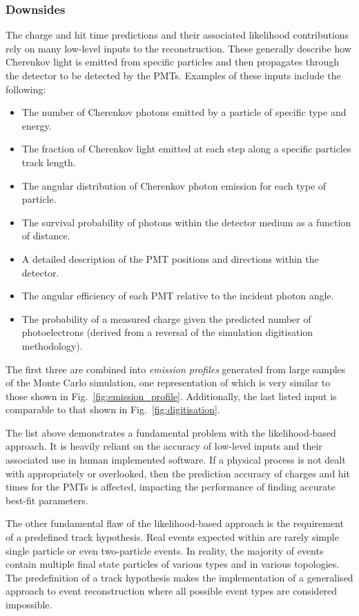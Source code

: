 \subsubsection*{Downsides} %

The charge and hit time predictions and their associated likelihood contributions rely on many
low-level inputs to the reconstruction. These generally describe how Cherenkov light is emitted
from specific particles and then propagates through the detector to be detected by the PMTs.
Examples of these inputs include the following:
\begin{itemize}
    \item The number of Cherenkov photons emitted by a particle of specific type and energy.
    \item The fraction of Cherenkov light emitted at each step along a specific particles track
          length.
    \item The angular distribution of Cherenkov photon emission for each type of particle.
    \item The survival probability of photons within the detector medium as a function of
          distance.
    \item A detailed description of the PMT positions and directions within the detector.
    \item The angular efficiency of each PMT relative to the incident photon angle.
    \item The probability of a measured charge given the predicted number of photoelectrons
          (derived from a reversal of the simulation digitisation methodology).
\end{itemize}
The first three are combined into \emph{emission profiles} generated from large samples of the
Monte Carlo simulation, one representation of which is very similar to those shown in
Fig.~\ref{fig:emission_profile}. Additionally, the last listed input is comparable to that shown
in Fig.~\ref{fig:digitisation}.

The list above demonstrates a fundamental problem with the likelihood-based approach. It is
heavily reliant on the accuracy of low-level inputs and their associated use in human implemented
software. If a physical process is not dealt with appropriately or overlooked, then the prediction
accuracy of charges and hit times for the PMTs is affected, impacting the performance of finding
accurate best-fit parameters.

The other fundamental flaw of the likelihood-based approach is the requirement of a predefined
track hypothesis. Real events expected within \chips are rarely simple single particle or even
two-particle events. In reality, the majority of events contain multiple final state particles of
various types and in various topologies. The predefinition of a track hypothesis makes the
implementation of a generalised approach to event reconstruction where all possible event types
are considered impossible.

